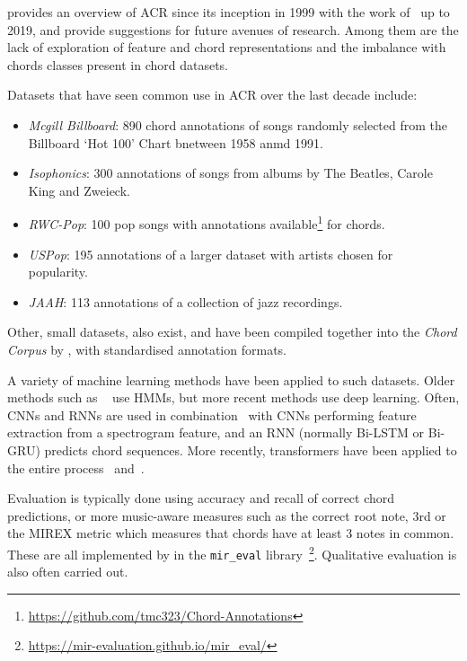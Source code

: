 \cite{20YearsofACR} provides an overview of ACR since its inception in 1999 with the work of~\citet{FujishimaACR} up to 2019, and provide suggestions for future avenues of research. Among them are the lack of exploration of feature and chord representations and the imbalance with chords classes present in chord datasets.

Datasets that have seen common use in ACR over the last decade include:
\begin{itemize}
    \item \emph{Mcgill Billboard}: 890 chord annotations of songs randomly selected from the Billboard `Hot 100' Chart bnetween 1958 anmd 1991.~\citep{McgillBillboard}
    \item \emph{Isophonics}: 300 annotations of songs from albums by The Beatles, Carole King and Zweieck.~\citep{Isophonics}
    \item \emph{RWC-Pop}: 100 pop songs with annotations available\footnote{\url{https://github.com/tmc323/Chord-Annotations}} for chords.~\citep{RWC}
    \item \emph{USPop}: 195 annotations of a larger dataset with artists chosen for popularity.~\citep{USPop}
    \item \emph{JAAH}: 113 annotations of a collection of jazz recordings.~\cite{JAAH}
\end{itemize}

Other, small datasets, also exist, and have been compiled together into the \emph{Chord Corpus} by \citet{Choco}, with standardised annotation formats.

A variety of machine learning methods have been applied to such datasets. Older methods such as ~\cite{ACRHMM} use HMMs, but more recent methods use deep learning. Often, CNNs and RNNs are used in combination~\citep{ACRCNNRNN1,ACRLargeVocab1,StructuredTraining} with CNNs performing feature extraction from a spectrogram feature, and an RNN (normally Bi-LSTM or Bi-GRU) predicts chord sequences. More recently, transformers have been applied to the entire process~\citet{MelodyTranscriptionViaGenerativePreTraining} and~\citet{HarmonyTransformer,AttendToChords}.

Evaluation is typically done using accuracy and recall of correct chord predictions, or more music-aware measures such as the correct root note, 3rd or the MIREX metric which measures that chords have at least 3 notes in common. These are all implemented by \citet{MIREVAL} in the \texttt{mir\_eval} library~\footnote{\url{https://mir-evaluation.github.io/mir_eval/}}. Qualitative evaluation is also often carried out.

